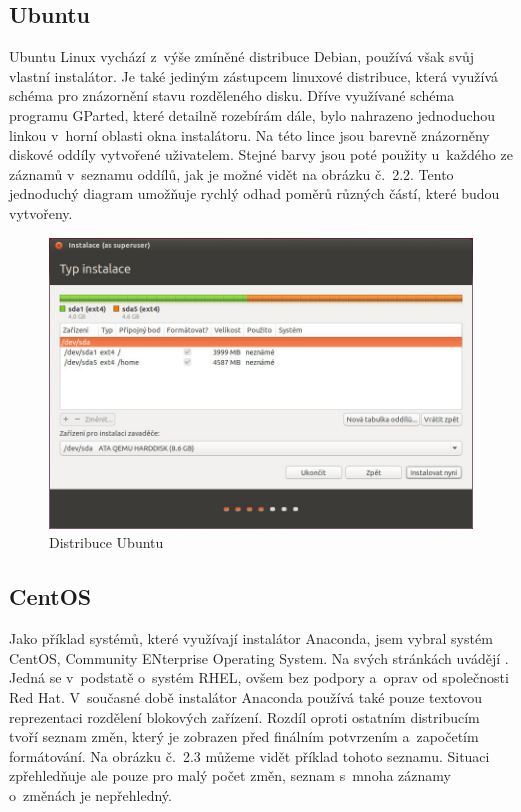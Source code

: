 \documentclass[color,table,oneside,nolot,nolof]{fithesis}
\begin{document}
\subsection{Ubuntu}

	Ubuntu Linux vychází z~výše zmíněné distribuce Debian\cite{ubuntu}, používá však svůj vlastní instalátor. Je také jediným zástupcem linuxové distribuce, která využívá  schéma 
	pro znázornění stavu rozděleného disku. Dříve využívané schéma programu GParted, které detailně rozebírám dále, bylo nahrazeno jednoduchou linkou v~horní oblasti okna instalátoru. Na této lince 
	jsou barevně znázorněny diskové 
	oddíly vytvořené uživatelem. Stejné barvy jsou poté použity u~každého ze záznamů v~seznamu oddílů, jak je možné vidět na obrázku č.~2.2. Tento jednoduchý diagram umožňuje rychlý odhad poměrů různých 
	částí, které budou vytvořeny.

\begin{figure}[h!]
	\label{fig:ubuntu}
	\caption{Distribuce Ubuntu}
	\centering
	\includegraphics[width=.8\columnwidth]{pictures/ubuntu1.jpg}
\end{figure}

\subsection{CentOS}

	Jako příklad systémů, které využívají instalátor Anaconda, jsem vybral systém CentOS, Community ENterprise Operating System. Na svých stránkách uvádějí \cite{centos}. Jedná se v~podstatě o~systém 
	RHEL, ovšem bez podpory a~oprav od společnosti Red Hat. V~současné době instalátor Anaconda používá také pouze textovou reprezentaci rozdělení blokových zařízení. 
	Rozdíl oproti ostatním distribucím tvoří 
	seznam změn, který je zobrazen před finálním potvrzením a~započetím formátování. Na obrázku č.~2.3 můžeme vidět příklad tohoto seznamu. Situaci zpřehledňuje ale pouze pro malý počet změn, seznam s~mnoha 
	záznamy o~změnách je nepřehledný. 
\end{document}
